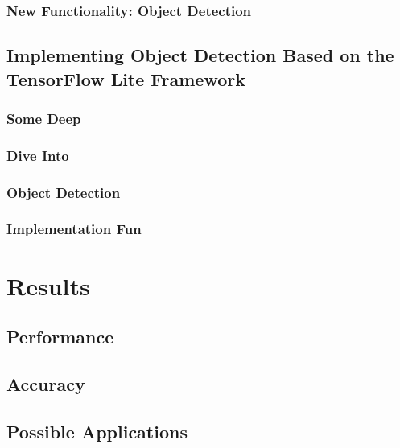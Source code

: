 \documentclass[
			   fontsize=11pt,
               paper=a4,
               bibliography=totoc,
               idxtotoc,
               headsepline,
               footsepline,
               footinclude=false,
               BCOR=12mm,
               DIV=13,
               openany,   %
               ]
               {scrbook}
\begin{document}
\subsection{New Functionality: Object Detection}

\section{Implementing Object Detection Based on the TensorFlow Lite Framework}

\subsection{Some Deep}
\subsection{Dive Into}
\subsection{Object Detection}
\subsection{Implementation Fun}


\chapter{Results}

\section{Performance}

\section{Accuracy}

\section{Possible Applications} %

\end{document}
